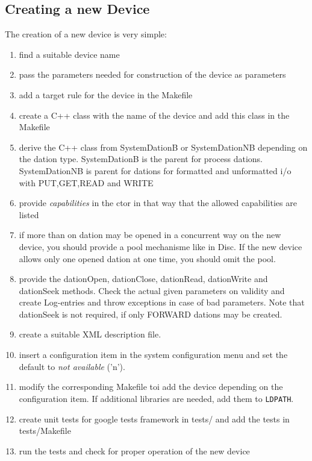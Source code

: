 \subsection{Creating a new Device}
The creation of a new device is very simple:
\begin{enumerate}
\item find a suitable device name
\item pass the parameters needed for construction of the device as
      parameters
\item add a target rule for the device in the Makefile
\item create a C++ class with the name of the device and add this class
      in the Makefile
\item derive the C++ class from SystemDationB or SystemDationNB depending
      on the dation type. SystemDationB is the parent for process dations.
      SystemDationNB is parent for dations for formatted and unformatted
      i/o with PUT,GET,READ and WRITE
\item provide {\em capabilities} in the ctor in that way that the allowed
      capabilities are listed
\item if more than on dation may be opened in a concurrent way on the new
      device, you should provide a pool mechanisme like in Disc.
      If the new device allows only one opened dation at one time, you 
      should omit the pool.
\item provide the dationOpen, dationClose, dationRead, dationWrite 
      and dationSeek methods. Check the actual given parameters on
      validity and create Log-entries and throw exceptions in case
      of bad parameters.
      Note that dationSeek is not required, if only FORWARD dations
      may be created.
\item create a suitable XML description file.
\item insert a configuration item  
      in the system configuration menu
      and set the default to {\em not available} ('n').
\item modify the corresponding Makefile toi add the device depending on
      the configuration item. If additional libraries are needed,
      add them to \texttt{LDPATH}. 
\item create unit tests for google tests framework in tests/ and add the
      tests in tests/Makefile
\item run the tests and check for proper operation of the new device
\end{enumerate}


